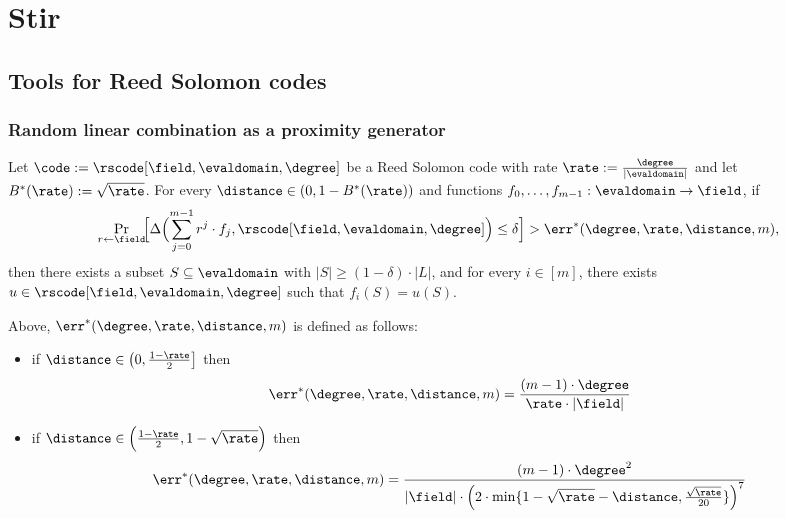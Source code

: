 
\section{Stir}

\subsection{Tools for Reed Solomon codes}
\subsubsection{Random linear combination as a proximity generator}\label{sec:proximity_gap}

\begin{theorem}\label{thm:proximity_gap}
    Let $\code := \rscode[\field,\evaldomain,\degree]$ be a Reed Solomon code with rate $\rate:=\frac{\degree}{|\evaldomain|}$ and let $B^*(\rate):=\sqrt{\rate}$. For every $\distance \in (0,1 - B^*(\rate))$ and functions $f_0,\ldots,f_{m-1} : \evaldomain \to \field$, if
    \[
    \Pr_{r\leftarrow\field}\!\Bigl[
      \Delta\Bigl(\sum_{j=0}^{m-1} r^j\cdot {f_j},\rscode[\field,\evaldomain,\degree]\Bigr)
      \le \delta
    \Bigr]>\err^*(\degree,\rate,\distance,m),
    \]
    then there exists a subset $S \subseteq \evaldomain$ with $|S| \ge (1 - \delta)\cdot|L|$,
    and for every $i \in [m]$, there exists $u \in \rscode[\field,\evaldomain,\degree]$ such that $f_i(S) = u(S)$.

    \medskip

    \noindent
    Above, $\err^*(\degree,\rate,\distance,m)$ is defined as follows:
    \begin{itemize}
        \item if $\distance \in \left(0,\frac{1-\rate}{2}\right]$ then
            \[
                \err^*(\degree,\rate,\distance,m)=\frac{(m-1)\cdot \degree}{\rate\cdot|\field|}
            \]
        \item if $\distance \in \Bigl(\frac{1-\rate}{2}, 1-\sqrt{\rate}\Bigr)$ then
        \[
            \err^*(\degree,\rate,\distance,m)=\frac{(m-1)\cdot {\degree}^2}{|\field|\cdot{\Bigl(2\cdot\min\{1-\sqrt{\rate}-\distance,\frac{\sqrt{\rate}}{20}\}\Bigr)}^7}
        \]
    \end{itemize}
\end{theorem}

